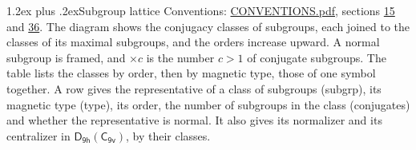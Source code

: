 \documentclass[10pt,a4paper]{article}
\makeatletter
\renewcommand\section{\@startsection{section}{1}{\z@}{-3ex plus -1ex minus -.2ex}%
  {1.2ex plus .2ex}{\normalfont\large\sffamily\bfseries\color{parttitle}}}
\numberwithin{equation}{section}
\newcommand{\grp}[1]{\mathsf{#1}}
\makeatother
\begin{document}
\section{Subgroup lattice}\label{s:subgroups}
Conventions: \href{../../CONVENTIONS.pdf}{CONVENTIONS.pdf}, sections \href{../../../rotation/CONVENTIONS.pdf\#conv.15}{15} and \href{../../CONVENTIONS.pdf\#conv.36}{36}.
The diagram shows the conjugacy classes of subgroups, each joined to the classes of its maximal subgroups, and the orders increase upward. \label{n:index.conjugates.c}\label{n:mark.conjugates}A normal subgroup is framed, and ${\times}c$ is the number $c > 1$ of conjugate subgroups. The table lists the classes by order, then by magnetic type, those of one symbol together. \label{n:head.subgroup}\label{n:head.magnetic.type}\label{n:head.order}\label{n:head.conjugates}\label{n:head.normal}A row gives the representative of a class of subgroups (subgrp), its magnetic type (type), its order, the number of subgroups in the class (conjugates) and whether the representative is normal. \label{n:head.normalizer}\label{n:head.centralizer}It also gives its normalizer and its centralizer in $\grp{D_{9h}}(\grp{C_{9v}})$, by their classes. 
\end{document}
